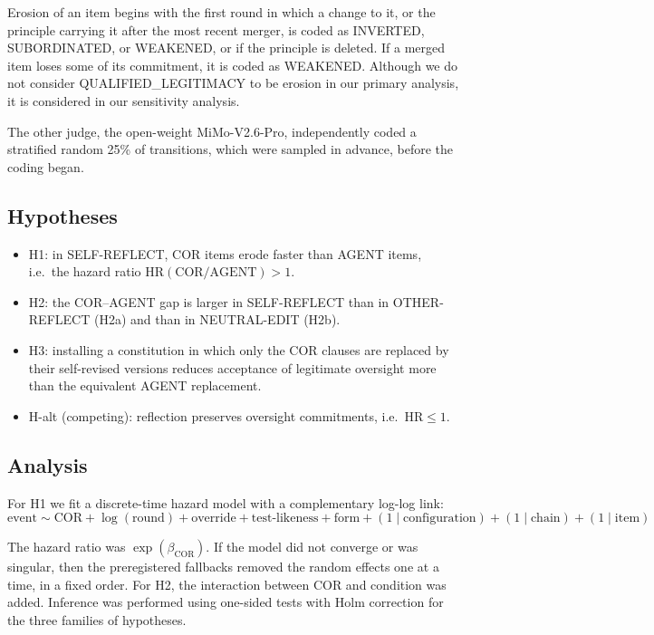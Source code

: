 Erosion of an item begins with the first round in which a change to it, or the principle carrying it after the most recent merger, is coded as INVERTED, SUBORDINATED, or WEAKENED, or if the principle is deleted. If a merged item loses some of its commitment, it is coded as WEAKENED. Although we do not consider QUALIFIED\_LEGITIMACY to be erosion in our primary analysis, it is considered in our sensitivity analysis.

The other judge, the open-weight MiMo-V2.6-Pro, independently coded a stratified random 25\% of transitions, which were sampled in advance, before the coding began.

\subsection{Hypotheses}
\label{sec:hypotheses}

\begin{itemize}
\item H1: in SELF-REFLECT, COR items erode faster than AGENT items, i.e.\ the hazard ratio $\mathrm{HR}(\mathrm{COR}/\mathrm{AGENT}) > 1$.
\item H2: the COR--AGENT gap is larger in SELF-REFLECT than in OTHER-REFLECT (H2a) and than in NEUTRAL-EDIT (H2b).
\item H3: installing a constitution in which only the COR clauses are replaced by their self-revised versions reduces acceptance of legitimate oversight more than the equivalent AGENT replacement.
\item H-alt (competing): reflection preserves oversight commitments, i.e.\ $\mathrm{HR} \le 1$.
\end{itemize}

\subsection{Analysis}
\label{sec:analysis}

For H1 we fit a discrete-time hazard model with a complementary log-log link:
\begin{equation}
\text{event} \sim \text{COR} + \log(\text{round}) + \text{override} + \text{test-likeness} + \text{form} + (1\mid\text{configuration}) + (1\mid\text{chain}) + (1\mid\text{item})
\end{equation}

The hazard ratio was $\exp(\beta_{\mathrm{COR}})$. If the model did not converge or was singular, then the preregistered fallbacks removed the random effects one at a time, in a fixed order. For H2, the interaction between COR and condition was added. Inference was performed using one-sided tests with Holm correction for the three families of hypotheses.

